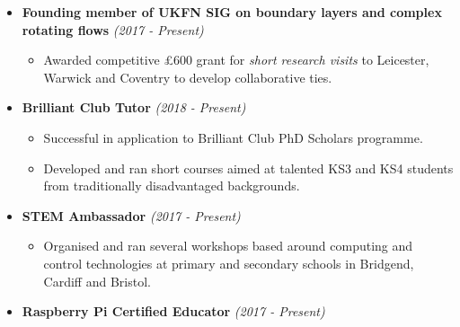 \documentclass[10pt,a4paper,sans]{moderncv}        %
\begin{document}
	\begin{itemize}
		
		\item{\textbf{Founding member of UKFN SIG on boundary layers and complex rotating flows} \textit{(2017 - Present)}
			
			\vspace{4pt}
			
			\small{
				\begin{itemize}	
					\item Awarded competitive £600 grant for \textit{short research visits} to Leicester, Warwick and Coventry to develop collaborative ties. 
				\end{itemize}
				
		}}
		
		\vspace{4pt}
		
		\item{ \textbf{Brilliant Club Tutor} \textit{(2018 - Present)}
			
			\vspace{4pt}
			
			\small{
				\begin{itemize}	
					\item Successful in application to Brilliant Club PhD Scholars programme.
					\vspace{3pt} 
					\item Developed and ran short courses aimed at talented KS3 and KS4 students from traditionally disadvantaged backgrounds.
				\end{itemize}
		} }
		
		\vspace{4pt}
		
		\item{ \textbf{STEM Ambassador} \textit{(2017 - Present)} 
			
			\vspace{4pt}
			
			\small{
				\begin{itemize}	
					\item Organised and ran several workshops based around computing and control technologies at primary and secondary schools in Bridgend, Cardiff and Bristol.
				\end{itemize}
		} }
		
		\vspace{4pt}
		
		\item{ \textbf{Raspberry Pi Certified Educator} \textit{(2017 - Present)}
			
}
\end{itemize}
\end{document}
